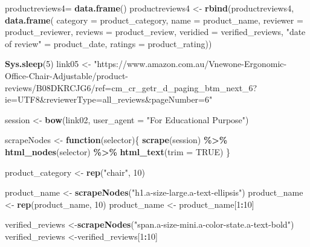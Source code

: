\documentclass[
]{article}
\newenvironment{Shaded}{\begin{snugshade}}{\end{snugshade}}
\newcommand{\AttributeTok}[1]{\textcolor[rgb]{0.13,0.29,0.53}{#1}}
\newcommand{\ConstantTok}[1]{\textcolor[rgb]{0.56,0.35,0.01}{#1}}
\newcommand{\ControlFlowTok}[1]{\textcolor[rgb]{0.13,0.29,0.53}{\textbf{#1}}}
\newcommand{\DecValTok}[1]{\textcolor[rgb]{0.00,0.00,0.81}{#1}}
\newcommand{\FunctionTok}[1]{\textcolor[rgb]{0.13,0.29,0.53}{\textbf{#1}}}
\newcommand{\NormalTok}[1]{#1}
\newcommand{\OtherTok}[1]{\textcolor[rgb]{0.56,0.35,0.01}{#1}}
\newcommand{\SpecialCharTok}[1]{\textcolor[rgb]{0.81,0.36,0.00}{\textbf{#1}}}
\newcommand{\StringTok}[1]{\textcolor[rgb]{0.31,0.60,0.02}{#1}}
\begin{document}
\begin{Shaded}
\begin{Highlighting}[]
\NormalTok{  productreviews4}\OtherTok{=} \FunctionTok{data.frame}\NormalTok{()}
\NormalTok{  productreviews4 }\OtherTok{\textless{}{-}} \FunctionTok{rbind}\NormalTok{(productreviews4, }\FunctionTok{data.frame}\NormalTok{(}
                      \AttributeTok{category =}\NormalTok{ product\_category,}
                      \AttributeTok{name =}\NormalTok{ product\_name,}
                      \AttributeTok{reviewer =}\NormalTok{ product\_reviewer,}
                      \AttributeTok{reviews =}\NormalTok{ product\_review,}
                      \AttributeTok{veridied =}\NormalTok{ verified\_reviews,}
                      \StringTok{"date of review"} \OtherTok{=}\NormalTok{ product\_date,}
                      \AttributeTok{ratings =}\NormalTok{ product\_rating))}
  
  \FunctionTok{Sys.sleep}\NormalTok{(}\DecValTok{5}\NormalTok{)}
\NormalTok{link05 }\OtherTok{\textless{}{-}} \StringTok{"https://www.amazon.com.au/Vnewone{-}Ergonomic{-}Office{-}Chair{-}Adjustable/product{-}reviews/B08DKRCJG6/ref=cm\_cr\_getr\_d\_paging\_btm\_next\_6?ie=UTF8\&reviewerType=all\_reviews\&pageNumber=6"}


\NormalTok{  session }\OtherTok{\textless{}{-}} \FunctionTok{bow}\NormalTok{(link02,}
               \AttributeTok{user\_agent =} \StringTok{"For Educational Purpose"}\NormalTok{)}

\NormalTok{  scrapeNodes }\OtherTok{\textless{}{-}} \ControlFlowTok{function}\NormalTok{(selector)\{}
    \FunctionTok{scrape}\NormalTok{(session) }\SpecialCharTok{\%\textgreater{}\%}
      \FunctionTok{html\_nodes}\NormalTok{(selector) }\SpecialCharTok{\%\textgreater{}\%}
      \FunctionTok{html\_text}\NormalTok{(}\AttributeTok{trim =} \ConstantTok{TRUE}\NormalTok{)}
\NormalTok{  \}}

\NormalTok{  product\_category }\OtherTok{\textless{}{-}} \FunctionTok{rep}\NormalTok{(}\StringTok{"chair"}\NormalTok{, }\DecValTok{10}\NormalTok{)}

\NormalTok{  product\_name }\OtherTok{\textless{}{-}} \FunctionTok{scrapeNodes}\NormalTok{(}\StringTok{"h1.a{-}size{-}large.a{-}text{-}ellipsis"}\NormalTok{)}
\NormalTok{  product\_name }\OtherTok{\textless{}{-}} \FunctionTok{rep}\NormalTok{(product\_name, }\DecValTok{10}\NormalTok{)}
\NormalTok{  product\_name }\OtherTok{\textless{}{-}}\NormalTok{ product\_name[}\DecValTok{1}\SpecialCharTok{:}\DecValTok{10}\NormalTok{]}
  
\NormalTok{  verified\_reviews }\OtherTok{\textless{}{-}}\FunctionTok{scrapeNodes}\NormalTok{(}\StringTok{"span.a{-}size{-}mini.a{-}color{-}state.a{-}text{-}bold"}\NormalTok{)}
\NormalTok{  verified\_reviews }\OtherTok{\textless{}{-}}\NormalTok{verified\_reviews[}\DecValTok{1}\SpecialCharTok{:}\DecValTok{10}\NormalTok{]}
  

\end{Highlighting}
\end{Shaded}
\end{document}
